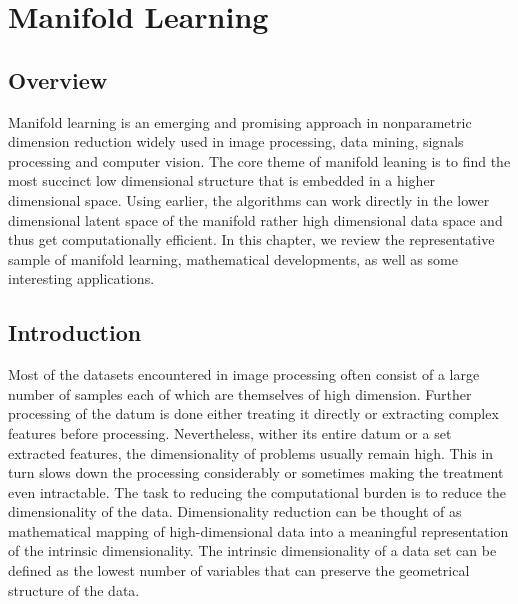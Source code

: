 \chapter{Manifold Learning} %

\label{Chapter3} %


\section*{Overview}
Manifold learning is an emerging and promising approach in nonparametric dimension reduction widely used in image processing, data mining, signals processing and computer vision. The core theme of manifold leaning is to find the most succinct low dimensional structure that is embedded
in a higher dimensional space. Using earlier, the algorithms can work directly in the lower dimensional latent space of the manifold rather high dimensional data space and thus get computationally efficient. In this chapter, we review the representative sample of manifold learning, mathematical developments, as well as some interesting applications. 
\section{Introduction}
Most of the datasets encountered in image processing often consist of
a large number of samples each of which are themselves of high dimension.
Further processing of the datum is done either treating it directly or extracting complex features before processing. Nevertheless, wither its
entire datum or a set extracted features, the dimensionality of
problems usually remain high. This in turn slows down the processing considerably or sometimes making the treatment even intractable. The task to reducing the computational burden is to reduce the dimensionality of the data. Dimensionality reduction can be thought of as mathematical mapping of high-dimensional data into a meaningful representation of the intrinsic dimensionality. The intrinsic dimensionality of a data set can be defined as the lowest number of variables that can preserve the geometrical structure of the data.


